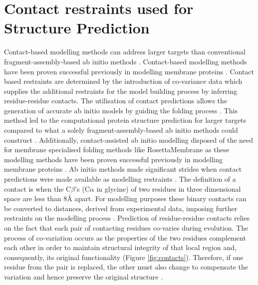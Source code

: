\section{Contact restraints used for Structure Prediction}
Contact-based modelling methods can address larger targets than conventional fragment-assembly-based ab initio methods \cite{Yang2020}. Contact-based modelling methods have been proven successful previously in modelling membrane proteins \cite{Hopf2012}.  Contact based restraints are determined by the introduction of co-variance data which supplies the additional restraints for the model building process by inferring residue-residue contacts.  The utilisation of contact predictions allows the generation of accurate ab initio models by guiding the folding process \cite{marks2011protein} .  This method led to the computational protein structure prediction for larger targets compared to what a solely fragment-assembly-based ab initio methods could construct \cite{Yang2020}. Additionally, contact-assisted ab initio modelling disposed of the need for membrane specialised folding methods like RosettaMembrane as these modelling methods have been proven successful previously in modelling membrane proteins \cite{Hopf2012,hopf2012three}.
Ab initio methods made significant strides when contact predictions were made available as modelling restraints \cite{Lee2016}. The definition of a contact is when the C$\beta$'s (C$\alpha$ in glycine) of two residues in three dimensional space are less than 8{\AA} apart.  For modelling purposes these binary contacts can be converted to distances, derived from experimental data, imposing further restraints on the modelling process \cite{braun2015combining}.   Prediction of residue-residue contacts relies on the fact that each pair of contacting residues co-varies during evolution. The process of co-variation occurs as the properties of the two residues complement each other in order to maintain structural integrity of that local region and, consequently, its original functionality (Figure \ref{fig:contacts}).  Therefore, if one residue from the pair is replaced, the other must also change to compensate the variation and hence preserve the original structure \cite{Lapedes}.  
